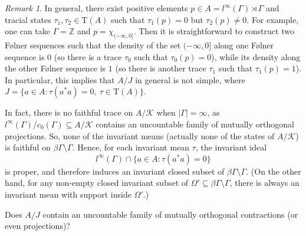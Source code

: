 \documentclass[12pt, oneside, psamsfonts]{amsart}
\theoremstyle{definition}
\theoremstyle{remark}
\newtheorem{rem}[thm]{Remark}
\numberwithin{equation}{section}
\newcommand{\abs}[1]{\left\vert#1\right\vert}
\newcommand{\Int}{\mathbb Z}
\newcommand{\tr}{\mathrm{T}}
\begin{document}
\begin{rem}
In general,  there exist positive elements $p \in A = l^\infty(\Gamma) \rtimes \Gamma$ and tracial states $\tau_1, \tau_2 \in \tr(A) $ such that $\tau_1(p) = 0$ but $\tau_2(p) \neq 0$. For example, one can take $\Gamma = \Int$ and $p = \chi_{(-\infty, 0]}$. Then it is straightforward to construct two F{\o}lner sequences such that the density of the set $(-\infty, 0]$ along one F{\o}lner sequence is $0$ (so there is a trace $\tau_0$ such that $\tau_0(p) = 0$), while its density along the other F{\o}lner sequence is $1$ (so there is another trace $\tau_1$ such that $\tau_1(p) = 1$). In particular, this implies that $A/J$ in general is not simple, where $J = \{a \in A: \tau(a^*a) = 0,\ \tau \in \tr(A)\}$. 


In fact, there is no faithful trace on $A/\mathcal K$ when $\abs{\Gamma} = \infty$, as $l^\infty(\Gamma) / c_0(\Gamma) \subseteq A/\mathcal K$ contains an uncountable family of mutually orthogonal projections. So, none of the invariant means (actually none of the states of $A/\mathcal K$) is faithful on $\beta\Gamma \setminus\Gamma$. Hence, for each invariant mean $\tau$, the invariant ideal 
$$l^\infty(\Gamma)\cap \{a\in A: \tau(a^*a) = 0\}$$ 
is proper, and therefore induces an invariant closed subset of $\beta\Gamma \setminus\Gamma$. (On the other hand, for any non-empty closed invariant subset of  $\Omega' \subseteq \beta\Gamma\setminus\Gamma$, there is always an invariant mean with support inside $\Omega'$.)



Does $A/J$ contain an uncountable family of mutually orthogonal contractions (or even projections)?

%
%
%
%

\end{rem}
\end{document}
